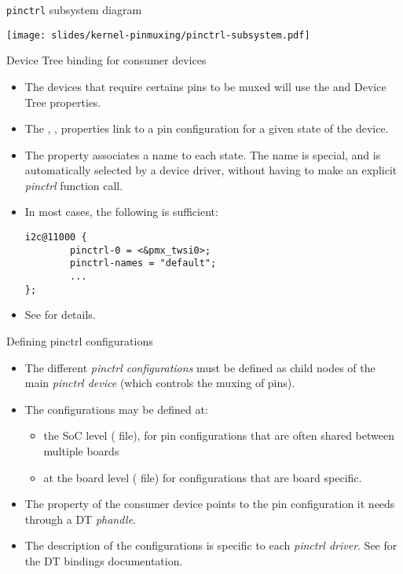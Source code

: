 \begin{frame}{{\tt pinctrl} subsystem diagram}
  \begin{center}
    \texttt{[image: slides/kernel-pinmuxing/pinctrl-subsystem.pdf]}
  \end{center}
\end{frame}

\begin{frame}[fragile]{Device Tree binding for consumer devices}
  \begin{itemize}
  \item The devices that require certains pins to be muxed will use
    the  and  Device Tree
    properties.
  \item The , , 
    properties link to a pin configuration for a given state of the
    device.
  \item The  property associates a name to each
    state. The name  is special, and is automatically
    selected by a device driver, without having to make an explicit
    {\em pinctrl} function call.
  \item In most cases, the following is sufficient:
    \begin{verbatim}
i2c@11000 {
        pinctrl-0 = <&pmx_twsi0>;
        pinctrl-names = "default";
        ...
};
\end{verbatim}
\item See 
  for details.
\end{itemize}
\end{frame}

\begin{frame}{Defining pinctrl configurations}
  \begin{itemize}
  \item The different {\em pinctrl configurations} must be defined as
    child nodes of the main {\em pinctrl device} (which controls the
    muxing of pins).
  \item The configurations may be defined at:
    \begin{itemize}
    \item the SoC level ( file), for pin configurations
      that are often shared between multiple boards
    \item at the board level ( file) for configurations
      that are board specific.
    \end{itemize}
  \item The  property of the consumer device points
    to the pin configuration it needs through a DT {\em phandle}.
  \item The description of the configurations is specific to each {\em
      pinctrl driver}. See
     for the DT
    bindings documentation.
  \end{itemize}
\end{frame}

